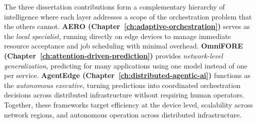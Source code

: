 The three dissertation contributions form a complementary hierarchy of intelligence where each layer addresses a scope of the orchestration problem that the others cannot. \textbf{AERO (Chapter~\ref{ch:adaptive-orchestration})} serves as the \textit{local specialist}, running directly on edge devices to manage immediate resource acceptance and job scheduling with minimal overhead. \textbf{OmniFORE (Chapter~\ref{ch:attention-driven-prediction})} provides \textit{network-level generalization}, predicting for many applications using one model instead of one per service. \textbf{AgentEdge (Chapter~\ref{ch:distributed-agentic-ai})} functions as the \textit{autonomous executive}, turning predictions into coordinated orchestration decisions across distributed infrastructure without requiring human operators. Together, these frameworks target efficiency at the device level, scalability across network regions, and autonomous operation across distributed infrastructure.
